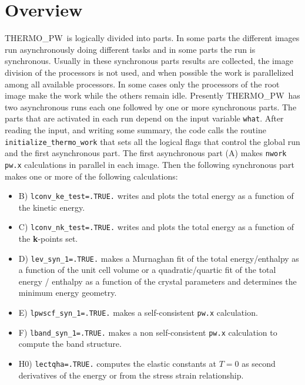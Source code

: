 \documentclass[12pt,a4paper]{article}
\def\tpw{{\sc THERMO\_PW}}
\begin{document}
\section{\color{coral}Overview}
\tpw\ is logically divided into parts. In some parts the different
images run asynchronously doing different tasks and in some parts the
run is synchronous. Usually in these synchronous parts results are 
collected, the image division of the processors is not used, and when possible
the work is parallelized among all available processors. In some cases
only the processors of the root image make the work while the others remain
idle.
Presently \tpw\ has two asynchronous runs each one followed
by one or more synchronous parts. The parts that are activated in
each run depend on the input variable \texttt{what}. After reading the input,
and writing some summary, the code calls the routine 
\texttt{initialize\_thermo\_work} that sets all the
logical flags that control the global run and the first asynchronous
part. The first asynchronous part (A) makes \texttt{nwork} \texttt{pw.x} 
calculations in parallel in each image. 
Then the following synchronous part makes one or more of
the following calculations:
\begin{itemize}

\item
B) \texttt{lconv\_ke\_test=.TRUE.} writes and plots the total
energy as a function of the kinetic energy.

\item
C) \texttt{lconv\_nk\_test=.TRUE.} writes and plots the total energy
as a function of the {\bf k}-points set.

\item
D) \texttt{lev\_syn\_1=.TRUE.} makes a Murnaghan fit of the 
total energy/enthalpy as a function of the unit cell volume or 
a quadratic/quartic fit of the total energy / enthalpy as a function 
of the crystal parameters and determines the minimum energy geometry.

\item
E) \texttt{lpwscf\_syn\_1=.TRUE.} makes a self-consistent \texttt{pw.x} 
calculation.

\item
F) \texttt{lband\_syn\_1=.TRUE.} makes a non self-consistent \texttt{pw.x}
calculation to compute the band structure.

\item
H0) \texttt{lectqha=.TRUE.} computes the elastic constants at $T=0$
as second derivatives of the energy or from the stress strain relationship. 

\end{itemize}
\end{document}
